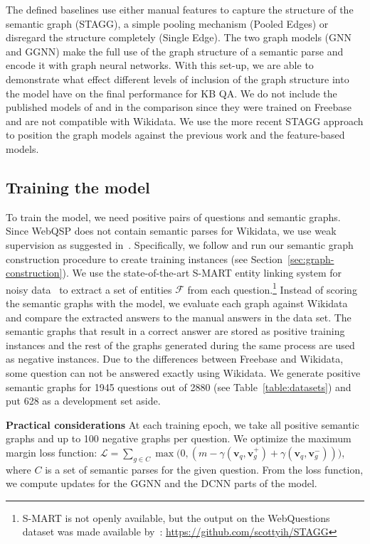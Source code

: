 \documentclass[11pt]{article}
\begin{document}
The defined baselines use either manual features to capture the structure of the semantic graph (STAGG), a simple pooling mechanism (Pooled Edges) or disregard the structure completely (Single Edge). The two graph models (GNN and GGNN) make the full use of the graph structure of a semantic parse and encode it with graph neural networks. With this set-up, we are able to demonstrate what effect different levels of inclusion of the graph structure into the model have on the final performance for KB QA. We do not include the published models of  and  in the comparison since they were trained on Freebase and are not compatible with Wikidata. We use the more recent STAGG approach to position the graph models against the previous work and the feature-based models.

\subsection{Training the model}

To train the model, we need positive pairs of questions and semantic graphs. Since WebQSP does not contain semantic parses for Wikidata, we use weak supervision as suggested in~. 
Specifically, we follow  and run our semantic graph construction procedure to create training instances (see Section~\ref{sec:graph-construction}). 
We use the state-of-the-art S-MART entity linking system for noisy data~\cite{Yang2015a} to extract a set of entities $\mathcal{F}$ from each question.\footnote{S-MART is not openly available, but the output on the WebQuestions dataset was made available by~: \url{https://github.com/scottyih/STAGG}}
Instead of scoring the semantic graphs with the model, we evaluate each graph against Wikidata and compare the extracted answers to the manual answers in the data set. The semantic graphs that result in a correct answer are stored as positive training instances and the rest of the graphs generated during the same process are used as negative instances. 
Due to the differences between Freebase and Wikidata, some question can not be answered exactly using Wikidata.
We generate positive semantic graphs for 1945 questions out of 2880 (see Table~\ref{table:datasets}) and put 628 as a development set aside.


\textbf{Practical considerations}
At each training epoch, we take all positive semantic graphs and up to 100 negative graphs per question. We optimize the maximum margin loss function: $\mathcal{L} = \sum_{g\in C} \max\big(0, (m - \gamma(\mathbf{v}_q,\mathbf{v}_g^+) + \gamma(\mathbf{v}_q,\mathbf{v}_g^-))\big)$, where $C$ is a set of semantic parses for the given question. From the loss function, we compute updates for the GGNN and the DCNN parts of the model.
\end{document}
